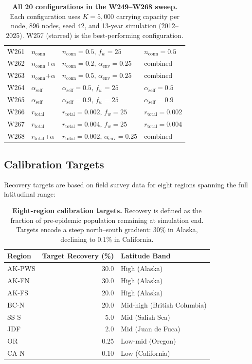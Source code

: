 \documentclass[11pt,a4paper,oneside]{article}
\begin{document}
\begin{table}[H]
\begin{tabular}{llll}
W261 & $n_{\text{conn}}$ & $n_{\text{conn}} = 0.5$, $f_w = 25$ & $n_{\text{conn}} = 0.5$ \\
\rowcolor{lightgray}
W262 & $n_{\text{conn}}$+$\alpha$ & $n_{\text{conn}} = 0.2$, $\alpha_{\text{env}} = 0.25$ & combined \\
W263 & $n_{\text{conn}}$+$\alpha$ & $n_{\text{conn}} = 0.5$, $\alpha_{\text{env}} = 0.25$ & combined \\
\rowcolor{lightgray}
W264 & $\alpha_{\text{self}}$ & $\alpha_{\text{self}} = 0.5$, $f_w = 25$ & $\alpha_{\text{self}} = 0.5$ \\
W265 & $\alpha_{\text{self}}$ & $\alpha_{\text{self}} = 0.9$, $f_w = 25$ & $\alpha_{\text{self}} = 0.9$ \\
\rowcolor{lightgray}
W266 & $r_{\text{total}}$ & $r_{\text{total}} = 0.002$, $f_w = 25$ & $r_{\text{total}} = 0.002$ \\
W267 & $r_{\text{total}}$ & $r_{\text{total}} = 0.004$, $f_w = 25$ & $r_{\text{total}} = 0.004$ \\
\rowcolor{lightgray}
W268 & $r_{\text{total}}$+$\alpha$ & $r_{\text{total}} = 0.002$, $\alpha_{\text{env}} = 0.25$ & combined \\
\bottomrule
\end{tabular}
\caption{\textbf{All 20 configurations in the W249--W268 sweep.} Each configuration uses $K = 5{,}000$ carrying capacity per node, 896 nodes, seed 42, and 13-year simulation (2012--2025). W257 (starred) is the best-performing configuration.}
\label{tab:configs}
\end{table}

\subsection{Calibration Targets}

Recovery targets are based on field survey data for eight regions spanning the full latitudinal range:

\begin{table}[H]
\centering
\begin{tabular}{lrl}
\toprule
\textbf{Region} & \textbf{Target Recovery (\%)} & \textbf{Latitude Band} \\
\midrule
AK-PWS & 30.0 & High (Alaska) \\
AK-FN  & 30.0 & High (Alaska) \\
AK-FS  & 20.0 & High (Alaska) \\
BC-N   & 20.0 & Mid-high (British Columbia) \\
SS-S   &  5.0 & Mid (Salish Sea) \\
JDF    &  2.0 & Mid (Juan de Fuca) \\
OR     &  0.25 & Low-mid (Oregon) \\
CA-N   &  0.10 & Low (California) \\
\bottomrule
\end{tabular}
\caption{\textbf{Eight-region calibration targets.} Recovery is defined as the fraction of pre-epidemic population remaining at simulation end. Targets encode a steep north--south gradient: 30\% in Alaska, declining to 0.1\% in California.}
\label{tab:targets}
\end{table}
\end{document}
